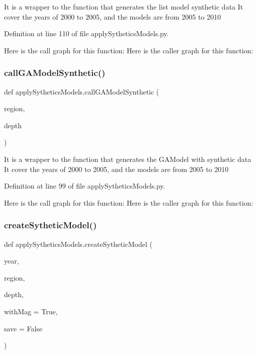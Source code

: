 \begin{DoxyVerb}It is a wrapper to the function that generates the list model synthetic data
It cover the years of 2000 to 2005, and the models are from 2005 to 2010
\end{DoxyVerb}
 

Definition at line 110 of file apply\+Sythetics\+Models.\+py.

Here is the call graph for this function\+:
Here is the caller graph for this function\+:
\mbox{\label{namespaceapply_sythetics_models_a79233a58d0e9a42597d89513d2149454}} 
\subsubsection{\texorpdfstring{call\+G\+A\+Model\+Synthetic()}{callGAModelSynthetic()}}
{\footnotesize\ttfamily def apply\+Sythetics\+Models.\+call\+G\+A\+Model\+Synthetic (\begin{DoxyParamCaption}\item[{}]{region,  }\item[{}]{depth }\end{DoxyParamCaption})}

\begin{DoxyVerb}It is a wrapper to the function that generates the GAModel with synthetic data
It cover the years of 2000 to 2005, and the models are from 2005 to 2010
\end{DoxyVerb}
 

Definition at line 99 of file apply\+Sythetics\+Models.\+py.

Here is the call graph for this function\+:
Here is the caller graph for this function\+:
\mbox{\label{namespaceapply_sythetics_models_ae63bd6c91d8fe0ff3980de5fdd73e5aa}} 
\subsubsection{\texorpdfstring{create\+Sythetic\+Model()}{createSytheticModel()}}
{\footnotesize\ttfamily def apply\+Sythetics\+Models.\+create\+Sythetic\+Model (\begin{DoxyParamCaption}\item[{}]{year,  }\item[{}]{region,  }\item[{}]{depth,  }\item[{}]{with\+Mag = {\ttfamily True},  }\item[{}]{save = {\ttfamily False} }\end{DoxyParamCaption})}

